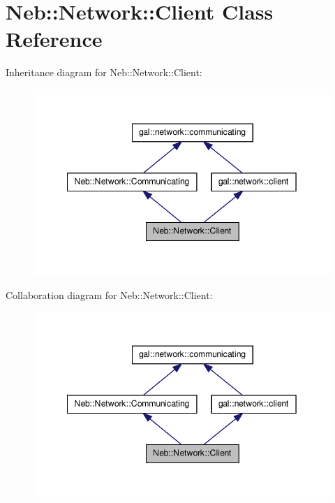 \hypertarget{classNeb_1_1Network_1_1Client}{\section{\-Neb\-:\-:\-Network\-:\-:\-Client \-Class \-Reference}
\label{classNeb_1_1Network_1_1Client}
}


\-Inheritance diagram for \-Neb\-:\-:\-Network\-:\-:\-Client\-:\nopagebreak
\begin{figure}[H]
\begin{center}
\leavevmode
\includegraphics[width=348pt]{classNeb_1_1Network_1_1Client__inherit__graph}
\end{center}
\end{figure}


\-Collaboration diagram for \-Neb\-:\-:\-Network\-:\-:\-Client\-:\nopagebreak
\begin{figure}[H]
\begin{center}
\leavevmode
\includegraphics[width=348pt]{classNeb_1_1Network_1_1Client__coll__graph}
\end{center}
\end{figure}
